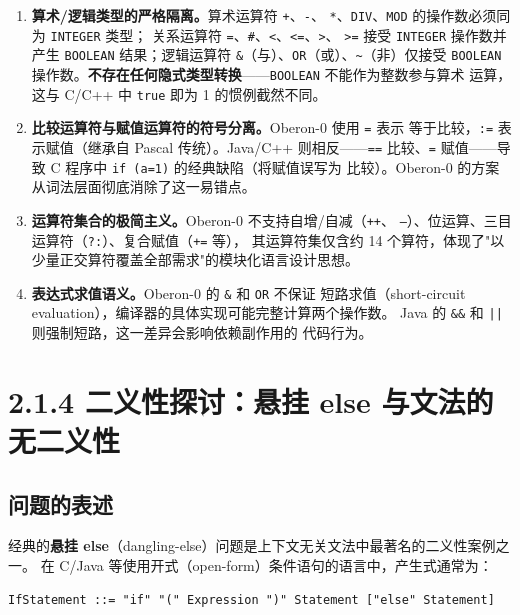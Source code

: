 \documentclass[a4paper]{article}
\begin{document}
\begin{enumerate}
    \item \textbf{算术/逻辑类型的严格隔离。}算术运算符 \texttt{+}、\texttt{-}、
    \texttt{*}、\texttt{DIV}、\texttt{MOD} 的操作数必须同为 \texttt{INTEGER} 类型；
    关系运算符 \texttt{=}、\texttt{\#}、\texttt{<}、\texttt{<=}、\texttt{>}、
    \texttt{>=} 接受 \texttt{INTEGER} 操作数并产生 \texttt{BOOLEAN} 结果；逻辑运算符
    \texttt{\&}（与）、\texttt{OR}（或）、\texttt{\~{}}（非）仅接受 \texttt{BOOLEAN}
    操作数。\textbf{不存在任何隐式类型转换}——\texttt{BOOLEAN} 不能作为整数参与算术
    运算，这与 C/C++ 中 \texttt{true} 即为 1 的惯例截然不同。

    \item \textbf{比较运算符与赋值运算符的符号分离。}Oberon-0 使用 \texttt{=} 表示
    等于比较，\texttt{:=} 表示赋值（继承自 Pascal 传统）。Java/C++ 则相反——\texttt{==}
    比较、\texttt{=} 赋值——导致 C 程序中 \texttt{if (a=1)} 的经典缺陷（将赋值误写为
    比较）。Oberon-0 的方案从词法层面彻底消除了这一易错点。

    \item \textbf{运算符集合的极简主义。}Oberon-0 不支持自增/自减（\texttt{++}、
    \texttt{--}）、位运算、三目运算符（\texttt{?:}）、复合赋值（\texttt{+=} 等），
    其运算符集仅含约 14 个算符，体现了"以少量正交算符覆盖全部需求"的模块化语言设计思想。

    \item \textbf{表达式求值语义。}Oberon-0 的 \texttt{\&} 和 \texttt{OR} 不保证
    短路求值（short-circuit evaluation），编译器的具体实现可能完整计算两个操作数。
    Java 的 \texttt{\&\&} 和 \texttt{||} 则强制短路，这一差异会影响依赖副作用的
    代码行为。
\end{enumerate}

\section{2.1.4 二义性探讨：悬挂 else 与文法的无二义性}

\subsection{问题的表述}

经典的\textbf{悬挂 else}（dangling-else）问题是上下文无关文法中最著名的二义性案例之一。
在 C/Java 等使用开式（open-form）条件语句的语言中，产生式通常为：

\begin{verbatim}
IfStatement ::= "if" "(" Expression ")" Statement ["else" Statement]
\end{verbatim}
\end{document}
